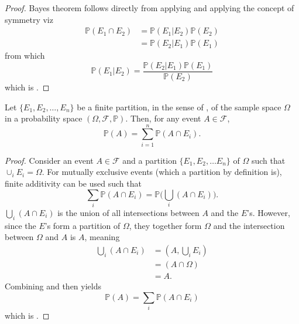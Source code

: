 \begin{proof}
	Bayes theorem follows directly from applying  and applying the concept of symmetry viz
	\begin{equation}
		\begin{split}
			\mathbb{P}(E_1 \cap E_2) &= \mathbb{P}(E_1| E_2)\mathbb{P}(E_2) \\
			& = \mathbb{P}(E_2|E_1)\mathbb{P}(E_1)
		\end{split}
		\label{eq:c2}
	\end{equation}
	from which
	\begin{equation}
		\mathbb{P}(E_1| E_2) = \frac{\mathbb{P}(E_2| E_1)\mathbb{P}(E_1)}{\mathbb{P}(E_2)}
	\end{equation}
	which is .
\end{proof}

\begin{theorem}
	\label{theorem:law_of_total_probability}
	Let $\{E_1, E_2, \dots, E_n\}$ be a finite partition, in the sense of , of the sample space $\Omega$ in a probability space $(\Omega, \mathcal{F}, \mathbb{P})$. Then, for any event $A \in \mathcal{F}$,
	\begin{equation}
		\mathbb{P}(A) = \sum_{i=1}^n \mathbb{P}(A \cap E_i).
		\label{eq:law_total_probability}
	\end{equation}
\end{theorem}

\begin{proof}
	Consider an event $A\in \mathcal{F}$ and a partition $\{E_1,E_2,\dots E_n\}$ of $\Omega$ such that $\cup_{i}E_i=\Omega$. For mutually exclusive events (which a partition by definition is), finite additivity can be used such that
	\begin{equation}
		\sum_{i}\mathbb{P}(A \cap E_i) = \mathbb{P}\bigg(\bigcup_{i}(A \cap E_i)\bigg).
		\label{eq:qq1}
	\end{equation} 
	$\bigcup_{i}(A \cap E_i)$ is the union of all intersections between $A$ and the $E$'s. However, since the $E$'s form a partition of $\Omega$, they together form $\Omega$ and the intersection between $\Omega$ and $A$ is $A$, meaning
	\begin{equation}
		\begin{split}
			\bigcup_{i}(A \cap E_i)  &= (A,\bigcup_{i}E_i)\\
			&= (A \cap \Omega)\\
			& =A.
		\end{split}
		\label{eq:qq2}
	\end{equation}
	Combining  and  then yields
	\begin{equation}
		\mathbb{P}(A) = \sum_{i} \mathbb{P}(A \cap E_i)
	\end{equation}
	which is .
\end{proof}

